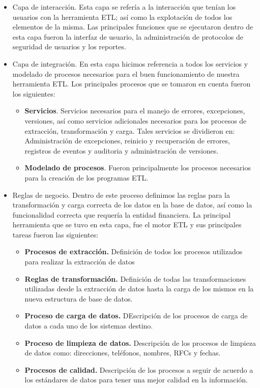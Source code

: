\documentclass[a4paper,openright,12pt]{book}
\begin{document}
\begin{itemize}

\item Capa de interacción. Esta capa se refería a la interacción que tenían
  los usuarios con la herramienta ETL; así como la explotación de todos los
  elementos de la misma. Las principales funciones que se ejecutaron dentro de
  esta capa fueron la interfaz de usuario, la administración de protocolos de
  seguridad de usuarios y los reportes.

\item Capa de integración. En esta capa hicimos referencia a todos los
  servicios y modelado de procesos necesarios para el buen funcionamiento de
  nuestra herramienta ETL. Los principales procesos que se tomaron en cuenta
  fueron los siguientes:

  \begin{itemize}
  \item \textbf{Servicios}. Servicios necesarios para el manejo de errores,
    excepciones, versiones, así como servicios adicionales necesarios para los
    procesos de extracción, transformación y carga. Tales servicios se
    dividieron en: Administración de excepciones, reinicio y recuperación de
    errores, registros de eventos y auditoria y administración de versiones.
  \item \textbf{Modelado de procesos}. Fueron principalmente los procesos
    necesarios para la creación de los programas ETL.
  \end{itemize}

\item Reglas de negocio. Dentro de este proceso definimos las reglas para la
  transformación y carga correcta de los datos en la base de datos, así como la
  funcionalidad correcta que requería la entidad financiera. La principal
  herramienta que se tuvo en esta capa, fue el motor ETL y sus principales
  tareas fueron las siguientes:

  \begin{itemize}
  \item \textbf{Procesos de extracción.} Definición de todos los procesos
    utilizados para realizar la extracción de datos
  \item \textbf{Reglas de transformación.} Definición de todas las
    transformaciones utilizadas desde la extracción de datos hasta la carga de
    los mismos en la nueva estructura de base de datos.
  \item \textbf{Proceso de carga de datos.} DEscripción de los procesos de carga
    de datos a cada uno de los sistemas destino.
  \item \textbf{Proceso de limpieza de datos.} Descripción de los procesos de
    limpieza de datos como: direcciones, teléfonos, nombres, RFCs y fechas.
  \item \textbf{Procesos de calidad.} Descripción de los procesos a seguir de
    acuerdo a los estándares de datos para tener una mejor calidad en la
    información.
  \end{itemize}

\end{itemize}
\end{document}
